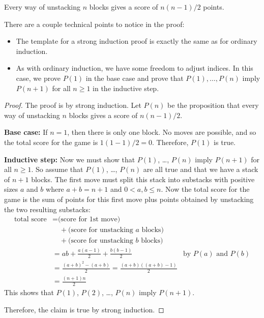 \begin{theorem}\label{stacking}
Every way of unstacking $n$ blocks gives a score of $n(n-1)/2$ points.
\end{theorem}

There are a couple technical points to notice in the proof:

\begin{itemize}

\item The template for a strong induction proof is exactly the same as
for ordinary induction.

\item As with ordinary induction, we have some freedom to adjust indices.
In this case, we prove $P(1)$ in the base case and prove that $P(1),
\dots, P(n)$ imply $P(n+1)$ for all $n \geq 1$ in the inductive step.

\end{itemize}

\begin{proof}
The proof is by strong induction.  Let $P(n)$ be the proposition that
every way of unstacking $n$ blocks gives a score of $n(n-1)/2$.

\textbf{Base case:} If $n = 1$, then there is only one
block.  No moves are possible, and so the total score for the game is
$1(1 - 1)/2 = 0$.  Therefore, $P(1)$ is true.

\textbf{Inductive step:} Now we must show that $P(1)$, \dots, $P(n)$ imply
$P(n+1)$ for all $n \geq 1$.  So assume that $P(1)$, \dots, $P(n)$ are all
true and that we have a stack of $n+1$ blocks.  The first move must split
this stack into substacks with positive sizes $a$ and $b$ where $a+b =
n+1$ and $0<a,b\leq n$.  Now the total score for the game is the sum of
points for this first move plus points obtained by unstacking the two
resulting substacks:
%
\begin{align*}
\text{total score}
    & = \text{(score for 1st move)} \\
    & \quad + \text{(score for unstacking $a$ blocks)} \\
    & \quad + \text{(score for unstacking $b$ blocks)} \\
    & = ab + \frac{a(a-1)}{2} + \frac{b(b-1)}{2} & \text{by $P(a)$ and $P(b)$}\\
    & = \frac{(a+b)^2-(a+b)}{2} = \frac{(a+b)((a+b)-1)}{2}\\
    & = \frac{(n+1)n}{2}
\end{align*}
%
This shows that $P(1)$, $P(2)$, \dots, $P(n)$ imply $P(n+1)$.

Therefore, the claim is true by strong induction.
\end{proof}

